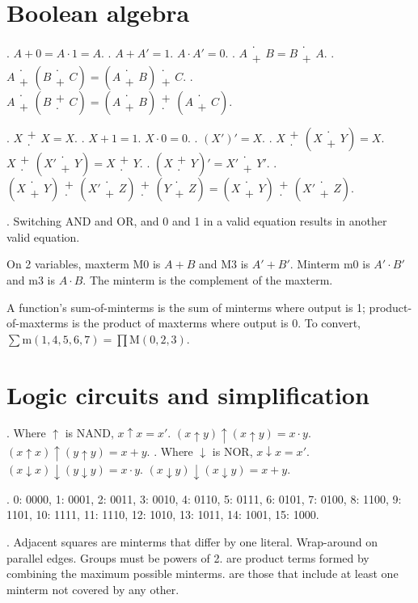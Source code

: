 \documentclass{slnotes}
\newcommand{\cdotplus}{\mathbin{\substack{\cdot\\+}}}
\newcommand{\pluscdot}{\mathbin{\substack{+\\\cdot}}}
\begin{document}
\chapter{Boolean algebra}
. \(A + 0 = A \cdot 1 = A\). . \(A + A' = 1\). \(A \cdot A' = 0\). . \(A \cdotplus B = B \cdotplus A\). . \(A \cdotplus (B \cdotplus C) = (A \cdotplus B) \cdotplus C\). . \(A \cdotplus (B \pluscdot C) = (A \cdotplus B) \pluscdot (A \cdotplus C)\).

. \(X \pluscdot X = X\). . \(X + 1 = 1\). \(X \cdot 0 = 0\). . \((X')' = X\). . \(X \pluscdot (X \cdotplus Y) = X\). \(X \pluscdot (X' \cdotplus Y) = X \pluscdot Y\). . \((X \pluscdot Y)' = X' \cdotplus Y'\). . \((X \cdotplus Y) \pluscdot (X' \cdotplus Z) \pluscdot (Y \cdotplus Z) = (X \cdotplus Y) \pluscdot (X' \cdotplus Z)\).

. Switching AND and OR, and 0 and 1 in a valid equation results in another valid equation.

On 2 variables, maxterm M0 is \(A + B\) and M3 is \(A' + B'\). Minterm m0 is \(A' \cdot B'\) and m3 is \(A \cdot B\). The minterm is the complement of the maxterm.

A function's sum-of-minterms is the sum of minterms where output is 1; product-of-maxterms is the product of maxterms where output is 0. To convert, \(\sum \mathrm m(1,4,5,6,7) = \prod \mathrm M(0, 2, 3)\).

\chapter{Logic circuits and simplification}
. Where \(\uparrow\) is NAND, \(x \uparrow x = x'\). \((x \uparrow y) \uparrow (x \uparrow y) = x \cdot y\). \((x \uparrow x) \uparrow (y \uparrow y) = x + y\). . Where \(\downarrow\) is NOR, \(x \downarrow x = x'\). \((x \downarrow x) \downarrow (y \downarrow y) = x \cdot y\). \((x \downarrow y) \downarrow (x \downarrow y) = x + y\).

. 0: 0000, 1: 0001, 2: 0011, 3: 0010, 4: 0110, 5: 0111, 6: 0101, 7: 0100, 8: 1100, 9: 1101, 10: 1111, 11: 1110, 12: 1010, 13: 1011, 14: 1001, 15: 1000.

. Adjacent squares are minterms that differ by one literal. Wrap-around on parallel edges. Groups must be powers of 2.  are product terms formed by combining the maximum possible minterms.  are those that include at least one minterm not covered by any other.
\end{document}

